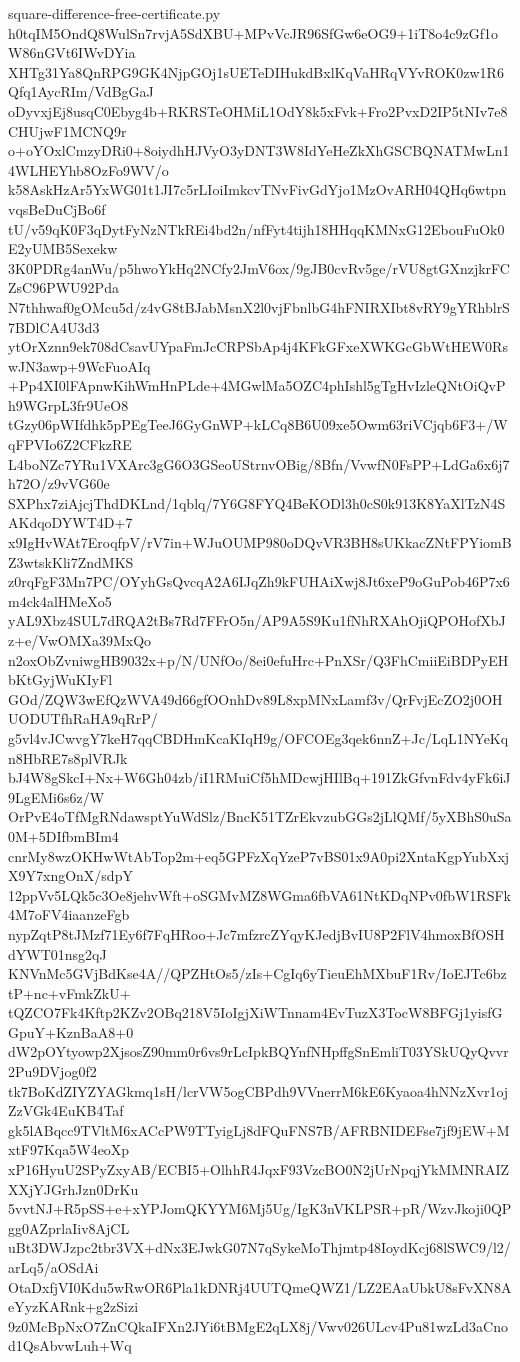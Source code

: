 \documentclass[11pt]{article}
\theoremstyle{definition}
\theoremstyle{remark}
\begin{document}
\begin{filecontents*}[overwrite]{square-difference-free-certificate.py}
h0tqIM5OndQ8WulSn7rvjA5SdXBU+MPvVcJR96SfGw6eOG9+1iT8o4c9zGf1oW86nGVt6IWvDYia
XHTg31Ya8QnRPG9GK4NjpGOj1sUETeDIHukdBxlKqVaHRqVYvROK0zw1R6Qfq1AycRIm/VdBgGaJ
oDyvxjEj8usqC0Ebyg4b+RKRSTeOHMiL1OdY8k5xFvk+Fro2PvxD2IP5tNIv7e8CHUjwF1MCNQ9r
o+oYOxlCmzyDRi0+8oiydhHJVyO3yDNT3W8IdYeHeZkXhGSCBQNATMwLn14WLHEYhb8OzFo9WV/o
k58AskHzAr5YxWG01t1JI7c5rLIoiImkcvTNvFivGdYjo1MzOvARH04QHq6wtpnvqsBeDuCjBo6f
tU/v59qK0F3qDytFyNzNTkREi4bd2n/nfFyt4tijh18HHqqKMNxG12EbouFuOk0E2yUMB5Sexekw
3K0PDRg4anWu/p5hwoYkHq2NCfy2JmV6ox/9gJB0cvRv5ge/rVU8gtGXnzjkrFCZsC96PWU92Pda
N7thhwaf0gOMcu5d/z4vG8tBJabMsnX2l0vjFbnlbG4hFNIRXIbt8vRY9gYRhblrS7BDlCA4U3d3
ytOrXznn9ek708dCsavUYpaFmJcCRPSbAp4j4KFkGFxeXWKGcGbWtHEW0RswJN3awp+9WcFuoAIq
+Pp4XI0lFApnwKihWmHnPLde+4MGwlMa5OZC4phIshl5gTgHvIzleQNtOiQvPh9WGrpL3fr9UeO8
tGzy06pWIfdhk5pPEgTeeJ6GyGnWP+kLCq8B6U09xe5Owm63riVCjqb6F3+/WqFPVIo6Z2CFkzRE
L4boNZc7YRu1VXArc3gG6O3GSeoUStrnvOBig/8Bfn/VvwfN0FsPP+LdGa6x6j7h72O/z9vVG60e
SXPhx7ziAjcjThdDKLnd/1qblq/7Y6G8FYQ4BeKODl3h0cS0k913K8YaXlTzN4SAKdqoDYWT4D+7
x9IgHvWAt7EroqfpV/rV7in+WJuOUMP980oDQvVR3BH8sUKkacZNtFPYiomBZ3wtskKli7ZndMKS
z0rqFgF3Mn7PC/OYyhGsQvcqA2A6IJqZh9kFUHAiXwj8Jt6xeP9oGuPob46P7x6m4ck4alHMeXo5
yAL9Xbz4SUL7dRQA2tBs7Rd7FFrO5n/AP9A5S9Ku1fNhRXAhOjiQPOHofXbJz+e/VwOMXa39MxQo
n2oxObZvniwgHB9032x+p/N/UNfOo/8ei0efuHrc+PnXSr/Q3FhCmiiEiBDPyEHbKtGyjWuKIyFl
GOd/ZQW3wEfQzWVA49d66gfOOnhDv89L8xpMNxLamf3v/QrFvjEcZO2j0OHUODUTfhRaHA9qRrP/
g5vl4vJCwvgY7keH7qqCBDHmKcaKIqH9g/OFCOEg3qek6nnZ+Jc/LqL1NYeKqn8HbRE7s8plVRJk
bJ4W8gSkcI+Nx+W6Gh04zb/iI1RMuiCf5hMDcwjHIlBq+191ZkGfvnFdv4yFk6iJ9LgEMi6s6z/W
OrPvE4oTfMgRNdawsptYuWdSlz/BncK51TZrEkvzubGGs2jLlQMf/5yXBhS0uSa0M+5DIfbmBIm4
cnrMy8wzOKHwWtAbTop2m+eq5GPFzXqYzeP7vBS01x9A0pi2XntaKgpYubXxjX9Y7xngOnX/sdpY
12ppVv5LQk5c3Oe8jehvWft+oSGMvMZ8WGma6fbVA61NtKDqNPv0fbW1RSFk4M7oFV4iaanzeFgb
nypZqtP8tJMzf71Ey6f7FqHRoo+Jc7mfzrcZYqyKJedjBvIU8P2FlV4hmoxBfOSHdYWT01nsg2qJ
KNVnMc5GVjBdKse4A//QPZHtOs5/zIs+CgIq6yTieuEhMXbuF1Rv/IoEJTc6bztP+nc+vFmkZkU+
tQZCO7Fk4Kftp2KZv2OBq218V5IoIgjXiWTnnam4EvTuzX3TocW8BFGj1yisfGGpuY+KznBaA8+0
dW2pOYtyowp2XjsosZ90mm0r6vs9rLcIpkBQYnfNHpffgSnEmliT03YSkUQyQvvr2Pu9DVjog0f2
tk7BoKdZIYZYAGkmq1sH/lcrVW5ogCBPdh9VVnerrM6kE6Kyaoa4hNNzXvr1ojZzVGk4EuKB4Taf
gk5lABqcc9TVltM6xACcPW9TTyigLj8dFQuFNS7B/AFRBNIDEFse7jf9jEW+MxtF97Kqa5W4eoXp
xP16HyuU2SPyZxyAB/ECBI5+OlhhR4JqxF93VzcBO0N2jUrNpqjYkMMNRAIZXXjYJGrhJzn0DrKu
5vvtNJ+R5pSS+e+xYPJomQKYYM6Mj5Ug/IgK3nVKLPSR+pR/WzvJkoji0QPgg0AZprlaIiv8AjCL
uBt3DWJzpc2tbr3VX+dNx3EJwkG07N7qSykeMoThjmtp48IoydKcj68lSWC9/l2/arLq5/aOSdAi
OtaDxfjVI0Kdu5wRwOR6Pla1kDNRj4UUTQmeQWZ1/LZ2EAaUbkU8sFvXN8AeYyzKARnk+g2zSizi
9z0McBpNxO7ZnCQkaIFXn2JYi6tBMgE2qLX8j/Vwv026ULcv4Pu81wzLd3aCnod1QsAbvwLuh+Wq

\end{filecontents*}
\end{document}
